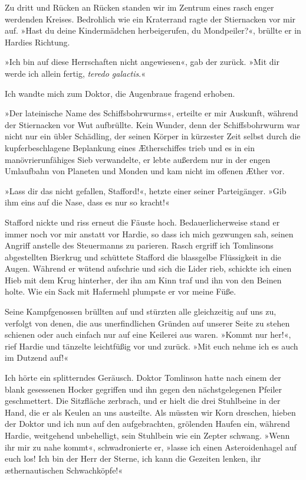 Zu dritt und Rücken an Rücken standen wir im Zentrum eines rasch
enger werdenden Kreises. Bedrohlich wie ein Kraterrand ragte der
Stiernacken vor mir auf. »Hast du deine Kindermädchen
herbeigerufen, du Mondpeiler?«, brüllte er in Hardies Richtung.

»Ich bin auf diese Herrschaften nicht angewiesen«, gab der zurück.
»Mit dir werde ich allein fertig, \emph{teredo galactis}.«

Ich wandte mich zum Doktor, die Augenbraue fragend erhoben.

»Der lateinische Name des Schiffsbohrwurms«, erteilte er mir
Auskunft, während der Stiernacken vor Wut aufbrüllte. Kein Wunder,
denn der Schiffsbohrwurm war nicht nur ein übler Schädling, der
seinen Körper in kürzester Zeit selbst durch die kupferbeschlagene
Beplankung eines Ætherschiffes trieb und es in ein
manövrierunfähiges Sieb verwandelte, er lebte außerdem nur in der
engen Umlaufbahn von Planeten und Monden und kam nicht im offenen
Æther vor.

»Lass dir das nicht gefallen, Stafford!«, hetzte einer seiner
Parteigänger. »Gib ihm eins auf die Nase, dass es nur so kracht!«

Stafford nickte und riss erneut die Fäuste hoch. Bedauerlicherweise
stand er immer noch vor mir anstatt vor Hardie, so dass ich mich
gezwungen sah, seinen Angriff anstelle des Steuermanns zu parieren.
Rasch ergriff ich Tomlinsons abgestellten Bierkrug und schüttete
Stafford die blassgelbe Flüssigkeit in die Augen. Während er wütend
aufschrie und sich die Lider rieb, schickte ich einen Hieb mit dem
Krug hinterher, der ihn am Kinn traf und ihn von den Beinen holte.
Wie ein Sack mit Hafermehl plumpste er vor meine Füße.

Seine Kampfgenossen brüllten auf und stürzten alle gleichzeitig auf
uns zu, verfolgt von denen, die aus unerfindlichen Gründen auf
unserer Seite zu stehen schienen oder auch einfach nur auf eine
Keilerei aus waren. »Kommt nur her!«, rief Hardie und tänzelte
leichtfüßig vor und zurück. »Mit euch nehme ich es auch im Dutzend
auf!«

Ich hörte ein splitterndes Geräusch. Doktor Tomlinson hatte nach
einem der blank gesessenen Hocker gegriffen und ihn gegen den
nächstgelegenen Pfeiler geschmettert. Die Sitzfläche zerbrach, und
er hielt die drei Stuhlbeine in der Hand, die er als Keulen an uns
austeilte. Als müssten wir Korn dreschen, hieben der Doktor und ich
nun auf den aufgebrachten, grölenden Haufen ein, während Hardie,
weitgehend unbehelligt, sein Stuhlbein wie ein Zepter schwang.
»Wenn ihr mir zu nahe kommt«, schwadronierte er, »lasse ich einen
Asteroidenhagel auf euch los! Ich bin der Herr der Sterne, ich kann
die Gezeiten lenken, ihr æthernautischen Schwachköpfe!«

